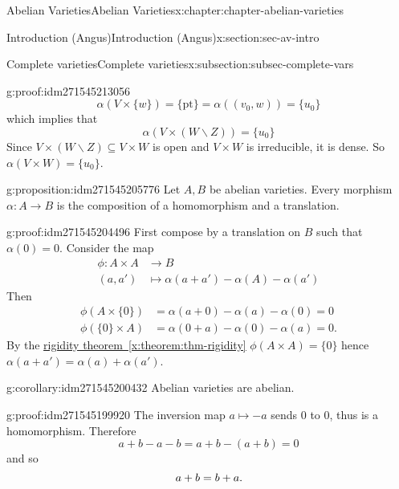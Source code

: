 \documentclass[oneside,10pt,]{book}
\newcommand{\qedhere}{\relax}
\numberwithin{equation}{section}
\newcommand{\amp}{&}
\begin{document}
\begin{chapterptx}{Abelian Varieties}{}{Abelian Varieties}{}{}{x:chapter:chapter-abelian-varieties}
\begin{sectionptx}{Introduction (Angus)}{}{Introduction (Angus)}{}{}{x:section:sec-av-intro}
\begin{subsectionptx}{Complete varieties}{}{Complete varieties}{}{}{x:subsection:subsec-complete-vars}
\begin{proofptx}{}{g:proof:idm271545213056}
\begin{equation*}
\alpha(V\times \{w\}) = \{\text{pt}\} = \alpha((v_0,w)) = \{u_0\}
\end{equation*}
which implies that%
\begin{equation*}
\alpha(V\times (W\smallsetminus Z)) = \{u_0\}
\end{equation*}
Since \(V\times (W\smallsetminus Z) \subseteq V\times W\) is open and \(V\times W\) is irreducible, it is dense. So \(\alpha(V\times W) = \{u_0\}\).%
\end{proofptx}
\begin{proposition}{}{}{g:proposition:idm271545205776}%
Let \(A,B\) be abelian varieties. Every morphism \(\alpha \colon A \to B \) is the composition of a homomorphism and a translation.%
\end{proposition}
\begin{proofptx}{}{g:proof:idm271545204496}
First compose by a translation on \(B\) such that \(\alpha(0) = 0\). Consider the map%
\begin{align*}
\phi \colon A\times A\amp\to B\\
(a,a')               \amp\mapsto \alpha(a+a') - \alpha(A) -\alpha(a')
\end{align*}
Then%
\begin{align*}
\phi(A\times\{0\}) \amp = \alpha(a+ 0) - \alpha(a) - \alpha(0) = 0\\
\phi(\{0\}\times A) \amp = \alpha(0+ a) - \alpha(0) - \alpha(a) = 0\text{.}
\end{align*}
By the \hyperref[x:theorem:thm-rigidity]{rigidity theorem~\ref{x:theorem:thm-rigidity}} \(\phi(A\times A) = \{0\}\) hence \(\alpha(a + a') = \alpha(a) + \alpha(a')\).%
\end{proofptx}
\begin{corollary}{}{}{g:corollary:idm271545200432}%
Abelian varieties are abelian.%
\end{corollary}
\begin{proofptx}{}{g:proof:idm271545199920}
The inversion map \(a \mapsto -a\) sends \(0\) to \(0\), thus is a homomorphism. Therefore%
\begin{equation*}
a+ b - a -b = a+b -(a+b) = 0
\end{equation*}
and so%
\begin{equation*}
a+b=b+a\text{.}\qedhere
\end{equation*}
%
\end{proofptx}
\end{subsectionptx}
\end{sectionptx}

\end{chapterptx}
\end{document}
